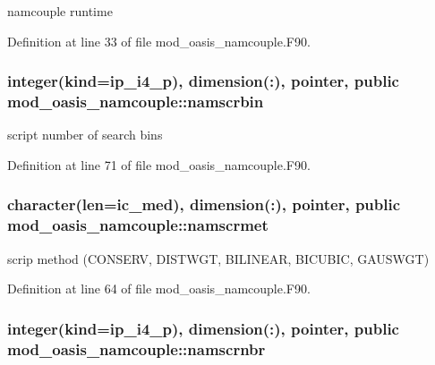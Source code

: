 namcouple runtime 



Definition at line 33 of file mod\+\_\+oasis\+\_\+namcouple.\+F90.

\hypertarget{classmod__oasis__namcouple_a728405e8f669b58d00c189abf8b62437}{
\subsubsection[{namscrbin}]{\setlength{\rightskip}{0pt plus 5cm}integer(kind=ip\+\_\+i4\+\_\+p), dimension(\+:), pointer, public mod\+\_\+oasis\+\_\+namcouple\+::namscrbin}}\label{classmod__oasis__namcouple_a728405e8f669b58d00c189abf8b62437}


script number of search bins 



Definition at line 71 of file mod\+\_\+oasis\+\_\+namcouple.\+F90.

\hypertarget{classmod__oasis__namcouple_a51c19e0892a72acc3dca2adb046ed175}{
\subsubsection[{namscrmet}]{\setlength{\rightskip}{0pt plus 5cm}character(len=ic\+\_\+med), dimension(\+:), pointer, public mod\+\_\+oasis\+\_\+namcouple\+::namscrmet}}\label{classmod__oasis__namcouple_a51c19e0892a72acc3dca2adb046ed175}


scrip method (C\+O\+N\+S\+E\+R\+V, D\+I\+S\+T\+W\+G\+T, B\+I\+L\+I\+N\+E\+A\+R, B\+I\+C\+U\+B\+I\+C, G\+A\+U\+S\+W\+G\+T) 



Definition at line 64 of file mod\+\_\+oasis\+\_\+namcouple.\+F90.

\hypertarget{classmod__oasis__namcouple_a20d614468823744b82118ee8cf2df852}{
\subsubsection[{namscrnbr}]{\setlength{\rightskip}{0pt plus 5cm}integer(kind=ip\+\_\+i4\+\_\+p), dimension(\+:), pointer, public mod\+\_\+oasis\+\_\+namcouple\+::namscrnbr}}\label{classmod__oasis__namcouple_a20d614468823744b82118ee8cf2df852}


